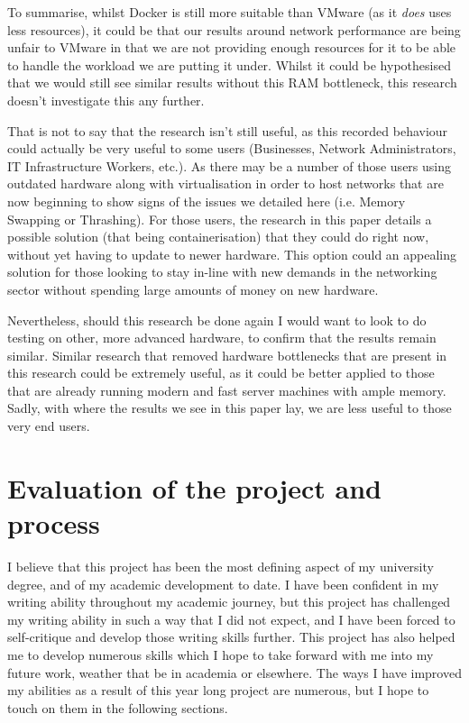 To summarise, whilst Docker is still more suitable than VMware (as it \emph{does} uses less resources), it could be that our results around network performance are being unfair to VMware in that we are not providing enough resources for it to be able to handle the workload we are putting it under. Whilst it could be hypothesised that we would still see similar results without this RAM bottleneck, this research doesn't investigate this any further.

That is not to say that the research isn't still useful, as this recorded behaviour could actually be very useful to some users (Businesses, Network Administrators, IT Infrastructure Workers, etc.). As there may be a number of those users using outdated hardware along with virtualisation in order to host networks that are now beginning to show signs of the issues we detailed here (i.e. Memory Swapping or Thrashing). For those users, the research in this paper details a possible solution (that being containerisation) that they could do right now, without yet having to update to newer hardware. This option could an appealing solution for those looking to stay in-line with new demands in the networking sector without spending large amounts of money on new hardware.

Nevertheless, should this research be done again I would want to look to do testing on other, more advanced hardware, to confirm that the results remain similar. Similar research that removed hardware bottlenecks that are present in this research could be extremely useful, as it could be better applied to those that are already running modern and fast server machines with ample memory. Sadly, with where the results we see in this paper lay, we are less useful to those very end users.



\chapter{Evaluation of the project and process}%
I believe that this project has been the most defining aspect of my university degree, and of my academic development to date. I have been confident in my writing ability throughout my academic journey, but this project has challenged my writing ability in such a way that I did not expect, and I have been forced to self-critique and develop those writing skills further. This project has also helped me to develop numerous skills which I hope to take forward with me into my future work, weather that be in academia or elsewhere. The ways I have improved my abilities as a result of this year long project are numerous, but I hope to touch on them in the following sections.

